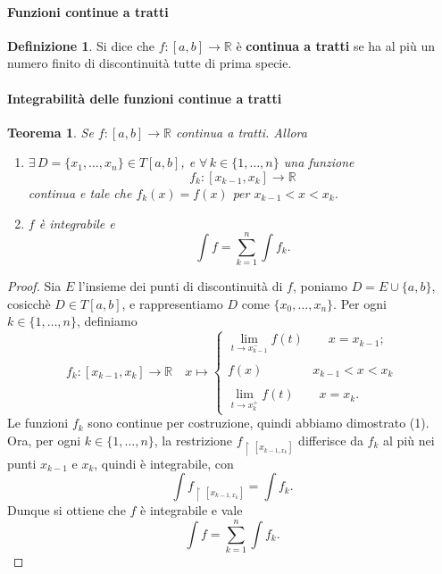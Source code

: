 \documentclass{article}
\theoremstyle{plain}
\newtheorem{thm}{Teorema}[section]
\theoremstyle{definition}
\newtheorem{defn}{Definizione}[section]
\theoremstyle{remark}
\begin{document}
\vspace{10pt}

\paragraph{Funzioni continue a tratti}
\begin{bxthm}
\begin{defn}
    Si dice che $f:[a,b]\to\mathbb{R}$ è \textbf{continua a tratti} se ha al più un numero finito di discontinuità tutte di prima specie.
\end{defn}
\end{bxthm}

\vspace{10pt}

\paragraph{Integrabilità delle funzioni continue a tratti}
\begin{bxthm}
\begin{thm}
    Se $f:[a,b]\to\mathbb{R}$ continua a tratti. Allora
    \begin{enumerate}
        \item $\exists\,D=\{x_1,\dots,x_n\}\in T[a,b]$, e $\forall\,k\in\{1,\dots,n\}$ una funzione 
        \[f_k:[x_{k-1},x_k]\to\mathbb{R}\]
        continua e tale che $f_k(x)=f(x)$ per $x_{k-1}<x<x_k$.
        \item $f$ è integrabile e 
        \[\int f=\sum_{k=1}^{n}\int f_k.\]
    \end{enumerate}
\end{thm}
\end{bxthm}
\begin{proof}
    Sia $E$ l'insieme dei punti di discontinuità di $f$, poniamo $D=E\cup\{a,b\}$, cosicchè $D\in T[a,b]$, e rappresentiamo 
    $D$ come $\{x_0,\dots,x_n\}$.
    Per ogni $k\in\{1,\dots,n\}$, definiamo 
    \[ f_k:[x_{k-1},x_k]\to\mathbb{R}\quad 
        x\mapsto\begin{cases}
            \lim\limits_{t\to x_{k-1}^-}f(t)\quad\quad x=x_{k-1};\\\\
            f(x)\quad\quad\quad\quad x_{k-1}<x<x_k\\\\
            \lim\limits_{t\to x_{k}^+}f(t)\quad\quad x=x_{k}.
        \end{cases} \]
    Le funzioni $f_k$ sono continue per costruzione, quindi abbiamo dimostrato (1).
    Ora, per ogni $k\in\{1,\dots,n\}$, la restrizione $f_{\upharpoonright\ [x_{k-1,x_k}]}$ differisce da $f_k$ al più nei punti $x_{k-1}$ e $x_k$,
    quindi è integrabile, con 
    \[\int f_{\upharpoonright\ [x_{k-1,x_k}]}=\int f_k.\]
    Dunque si ottiene che $f$ è integrabile e vale \[\int f=\sum_{k=1}^{n}\int f_k.\]
\end{proof}
\end{document}
